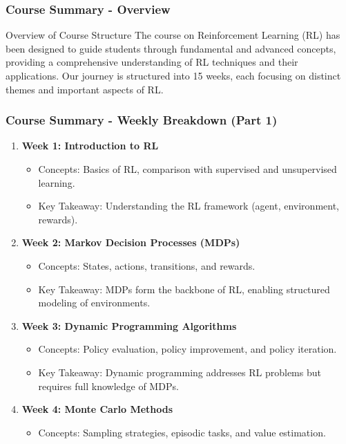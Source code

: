 \documentclass[aspectratio=169]{beamer}
\begin{document}
\begin{frame}[fragile]
    \frametitle{Course Summary - Overview}
    \begin{block}{Overview of Course Structure}
        The course on Reinforcement Learning (RL) has been designed to guide students through fundamental and advanced concepts, providing a comprehensive understanding of RL techniques and their applications. Our journey is structured into 15 weeks, each focusing on distinct themes and important aspects of RL.
    \end{block}
\end{frame}

\begin{frame}[fragile]
    \frametitle{Course Summary - Weekly Breakdown (Part 1)}
    \begin{enumerate}
        \item \textbf{Week 1: Introduction to RL}
            \begin{itemize}
                \item Concepts: Basics of RL, comparison with supervised and unsupervised learning. 
                \item Key Takeaway: Understanding the RL framework (agent, environment, rewards).
            \end{itemize}
        \item \textbf{Week 2: Markov Decision Processes (MDPs)}
            \begin{itemize}
                \item Concepts: States, actions, transitions, and rewards.
                \item Key Takeaway: MDPs form the backbone of RL, enabling structured modeling of environments.
            \end{itemize}
        \item \textbf{Week 3: Dynamic Programming Algorithms}
            \begin{itemize}
                \item Concepts: Policy evaluation, policy improvement, and policy iteration.
                \item Key Takeaway: Dynamic programming addresses RL problems but requires full knowledge of MDPs.
            \end{itemize}
        \item \textbf{Week 4: Monte Carlo Methods}
            \begin{itemize}
                \item Concepts: Sampling strategies, episodic tasks, and value estimation.

\end{itemize}
\end{enumerate}
\end{frame}
\end{document}
